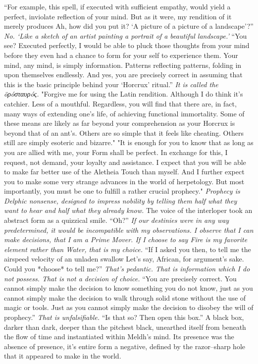 \begin{flushright}
“For example, this spell, if executed with sufficient empathy, would yield a perfect, inviolate reflection of your mind. But as it were, my rendition of it merely produces{\el} Ah, how did you put it? ‘A picture of a picture of a landscape’?”
\SmallVSpace
\emph{No. ‘Like a sketch of an artist painting a portrait of a beautiful landscape.’}
\SmallVSpace
“You see? Executed perfectly, I would be able to pluck those thoughts from your mind before they even had a chance to form for your self to experience them. Your mind, any mind, is simply information. Patterns reflecting patterns, folding in upon themselves endlessly. And yes, you are precisely correct in assuming that this is the basic principle behind your ‘Horcrux’ ritual.”
\SmallVSpace
\emph{It is called the öρóσταυρóς.}
\SmallVSpace
"Forgive me for using the Latin rendition. Although I do think it’s catchier. Less of a mouthful. Regardless, you will find that there are, in fact, many ways of extending one’s life, of achieving functional immortality. Some of these means are likely as far beyond your comprehension as your Horcrux is beyond that of an ant’s. Others are so simple that it feels like cheating. Others still are simply esoteric and bizarre."
\SmallVSpace
"It is enough for you to know that as long as you are allied with me, your Form shall be perfect. In exchange for this, I request, not demand, your loyalty and assistance. I expect that you will be able to make far better use of the Aletheia Touch than myself. And I further expect you to make some very strange advances in the world of herpetology. But most importantly, you must be one to fulfill a rather crucial prophecy."
\SmallVSpace
\emph{Prophecy is Delphic nonsense, designed to impress nobility by telling them half what they want to hear and half what they already know.}
\SmallVSpace
The voice of the interloper took an abstract form as a quizzical smile. “Oh?”
\SmallVSpace
\emph{If our destinies were in any way predetermined, it would be incompatible with my observations. I observe that I can make decisions, that I am a Prime Mover. If I choose to say Fire is my favorite element rather than Water, that is my choice.}
\SmallVSpace
“If I asked you then, to tell me the airspeed velocity of an unladen swallow{\el} Let’s say, African, for argument’s sake. Could you *choose* to tell me?”
\SmallVSpace
\emph{That’s pedantic. That is information which I do not possess. That is not a decision of choice.}
\SmallVSpace
“You are precisely correct. You cannot simply make the decision to know something you do not know, just as you cannot simply make the decision to walk through solid stone without the use of magic or tools. Just as you cannot simply make the decision to disobey the will of prophecy.”
\SmallVSpace
\emph{That is unfalsifiable.}
\SmallVSpace
“Is that so? Then open this box.”
\SmallVSpace
A black box, darker than dark, deeper than the pitchest black, unearthed itself from beneath the flow of time and instantiated within Meldh’s mind. Its presence was the absence of presence, it’s entire form a negative, defined by the razor\mbox{--}sharp hole that it appeared to make in the world.


\end{flushright}
